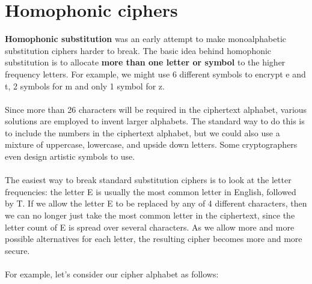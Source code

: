 \documentclass[Lau,binding=0.6cm,oneside]{sapthesis}
\begin{document}
\section{Homophonic ciphers}
\textbf{Homophonic substitution} was an early attempt to make monoalphabetic substitution ciphers harder to break. The basic idea behind homophonic substitution is to allocate \textbf{more than one letter or symbol} to the higher frequency letters\supercite{homophonic}. For example, we might use 6 different symbols to encrypt \textsf{e} and \textsf{t}, 2 symbols for \textsf{m} and only 1 symbol for \textsf{z}.\\\\
Since more than 26 characters will be required in the ciphertext alphabet, various solutions are employed to invent larger alphabets. The standard way to do this is to include the numbers in the ciphertext alphabet, but we could also use a mixture of uppercase, lowercase, and upside down letters. Some cryptographers even design artistic symbols to use.\\\\
The easiest way to break standard substitution ciphers is to look at the letter frequencies: the letter \textsf{E} is usually the most common letter in English, followed by \textsf{T}. If we allow the letter \textsf{E} to be replaced by any of 4 different characters, then we can no longer just take the most common letter in the ciphertext, since the letter count of \textsf{E} is spread over several characters. As we allow more and more possible alternatives for each letter, the resulting cipher becomes more and more secure.\\\\
For example, let's consider our cipher alphabet as follows:
\end{document}
